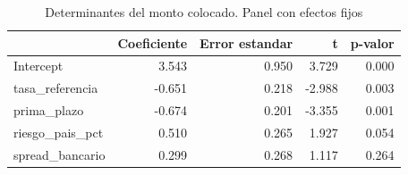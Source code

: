 \begin{table}
\caption{Determinantes del monto colocado. Panel con efectos fijos}
\label{tab:tabla3_panel_efectos_fijos}
\begin{tabular}{lrrrr}
\toprule
 & Coeficiente & Error estandar & t & p-valor \\
\midrule
Intercept & 3.543 & 0.950 & 3.729 & 0.000 \\
tasa_referencia & -0.651 & 0.218 & -2.988 & 0.003 \\
prima_plazo & -0.674 & 0.201 & -3.355 & 0.001 \\
riesgo_pais_pct & 0.510 & 0.265 & 1.927 & 0.054 \\
spread_bancario & 0.299 & 0.268 & 1.117 & 0.264 \\
\bottomrule
\end{tabular}
\end{table}
